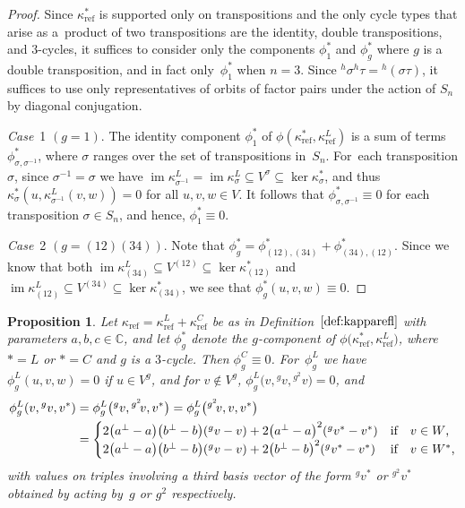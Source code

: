 \documentclass[10pt,a4paper]{amsart}
\numberwithin{equation}{section}
\newtheorem{Proposition}[Theorem]{Proposition}
 { \theoremstyle{definition}
\newtheorem{Definition}[Theorem]{Definition}
\newtheorem{Remark}[Theorem]{Remark}
\newtheorem{case}{Case}}
\newcommand{\actby}[1]{{}^{#1}}
\newcommand{\actbylessspace}[1]{{}^{#1}\!}
\DeclareMathOperator{\im}{im}
\DeclareMathOperator{\refl}{ref}
\begin{document}
\begin{proof}
Since $\kappa^{*}_{\refl}$ is supported only on transpositions and the only cycle
types that arise as a~product of two transpositions are the identity, double transpositions,
and $3$-cycles, it suffices to consider only the components $\phi_1^*$ and $\phi_g^*$
where $g$ is a double transposition, and in fact only~$\phi^{*}_1$ when $n=3$.
Since
$\actby{h}\sigma\actby{h}\tau=\actby{h}(\sigma \tau)$, it suffices to use only
representatives of orbits of factor pairs under the action of $S_n$ by diagonal conjugation.
	
\textit{Case}~1 $(g=1)$.
The identity component $\phi^{*}_1$ of $\phi(\kappa^{*}_{\refl},\kappa^L_{\refl})$ is
a sum of terms $\phi^{*}_{\sigma,\sigma^{-1}}$, where $\sigma$ ranges over the set of transpositions in~$S_n$. For~each transposition $\sigma$, since $\sigma^{-1}=\sigma$ we have
$\im\kappa^L_{\sigma^{-1}}=\im\kappa^L_{\sigma}\subseteq V^{\sigma} \subseteq\ker\kappa^{*}_{\sigma}$,
and thus $\kappa^{*}_{\sigma}(u,\kappa^L_{\sigma^{-1}}(v,w))=0$ for all $u,v,w\in V$.
It follows that $\phi^{*}_{\sigma,\sigma^{-1}}\equiv0$ for each transposition $\sigma\in S_n$,
and hence, $\phi^{*}_1\equiv 0$.

\textit{Case}~2 $(g=(12)(34))$.
Note that $\phi^{*}_g=
\phi^{*}_{(12),(34)}+\phi^{*}_{(34),(12)}$.
Since we know that both $\im\kappa^L_{(34)}\subseteq V^{(12)} \subseteq\ker\kappa^{*}_{(12)}$ and
$\im\kappa^L_{(12)}\subseteq V^{(34)} \subseteq\ker\kappa^{*}_{(34)}$, we see
that $\phi^{*}_g(u,v,w)\equiv 0$.
\end{proof}

\begin{Proposition}\label{prop:3-cycle}
Let $\kappa_{\refl}=\kappa^L_{\refl}+\kappa^C_{\refl}$ be as in
Definition~$\ref{def:kapparefl}$ with parameters $a,b,c\in\mathbb{C}$, and let
$\phi_g^{*}$ denote the $g$-component
of $\phi\big(\kappa^*_{\refl},\kappa^L_{\refl}\big)$, where $*=L$
or $*=C$ and $g$ is a $3$-cycle. Then $\phi_g^C\equiv 0$. For~$\phi_g^L$ we have
$\phi_g^L(u,v,w)=0$ if $u\in V^g$,
and for $v \notin V^g$, $\phi_g^L\big(v,\actby{g}v,\actbylessspace{g^2}v\big)=0$, and
\begin{align*} \phi_{g}^L(v,\actby{g}v,v^*)&=\phi_{g}^L\big(\actby{g}v,\actbylessspace{g^2}v,v^*\big)=\phi_{g}^L\big(\actbylessspace{g^2}v,v,v^*\big) \\
&=\begin{cases}
2\big(a^\perp-a\big)\big(b^\perp-b\big)(\actby{g}v-v)+2\big(a^\perp-a\big)^2(\actby{g}v^*-v^*) & \text{if\quad $v \in W$,} \\
2\big(a^\perp-a\big)\big(b^\perp-b\big)(\actby{g}v-v)+2\big(b^\perp-b\big)^2(\actby{g}v^*-v^*) & \text{if\quad $v \in W^*$,}
\end{cases}
\end{align*}
with values on triples involving a third basis vector of the form
$\actby{g}v^*$ or $\actbylessspace{g^2}v^*$ obtained by acting by~$g$ or $g^2$ respectively.
\end{Proposition}
\end{document}
